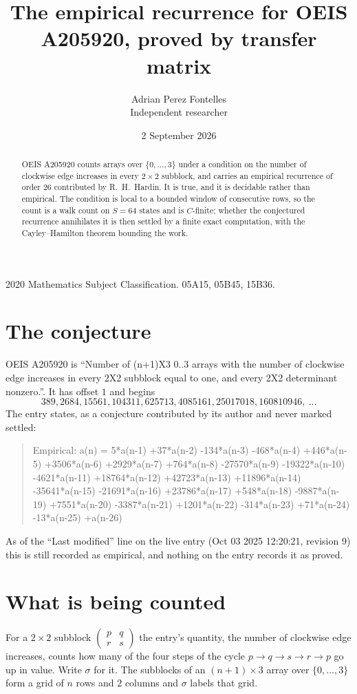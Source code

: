 \documentclass[11pt,a4paper]{article}
\title{The empirical recurrence for OEIS A205920, proved by transfer matrix}
\author{Adrian Perez Fontelles\\ \small Independent researcher}
\date{2 September 2026}
\theoremstyle{plain}
\theoremstyle{definition}
\begin{document}
\maketitle

\begin{abstract}
OEIS A205920 counts arrays over $\{0,\dots,3\}$ under a condition on the number of clockwise edge increases
in every $2\times2$ subblock, and carries an empirical recurrence of order $26$ contributed by
R.~H.~Hardin. It is true, and it is decidable rather than empirical. The condition is local to
a bounded window of consecutive rows, so the count is a walk count on $S=64$ states and is
$C$-finite; whether the conjectured recurrence annihilates it is then settled by a finite exact
computation, with the Cayley--Hamilton theorem bounding the work.
\end{abstract}

\noindent\small 2020 Mathematics Subject Classification. 05A15, 05B45, 15B36.\normalsize

\section{The conjecture}

OEIS A205920 is ``Number of (n+1)X3 0..3 arrays with the number of clockwise edge increases in every 2X2 subblock equal to one, and every 2X2 determinant nonzero.''. It has offset $1$ and begins
\[
389, 2684, 15561, 104311, 625713, 4085161, 25017018, 160810946,\ \dots
\]
The entry states, as a conjecture contributed by its author and never marked settled:
\begin{quote}
Empirical: a(n) = 5*a(n-1) +37*a(n-2) -134*a(n-3) -468*a(n-4) +446*a(n-5) +3506*a(n-6) +2929*a(n-7) +764*a(n-8) -27570*a(n-9) -19322*a(n-10) -4621*a(n-11) +18764*a(n-12) +42723*a(n-13) +11896*a(n-14) -35641*a(n-15) -21691*a(n-16) +23786*a(n-17) +548*a(n-18) -9887*a(n-19) +7551*a(n-20) -3387*a(n-21) +1201*a(n-22) -314*a(n-23) +71*a(n-24) -13*a(n-25) +a(n-26)
\end{quote}
As of the ``Last modified'' line on the live entry (Oct 03 2025 12:20:21, revision 9) this is still
recorded as empirical, and nothing on the entry records it as proved.

\section{What is being counted}

For a $2\times2$ subblock $\begin{pmatrix}p&q\\r&s\end{pmatrix}$ the
entry's quantity, the number of clockwise edge increases, counts how many of the four steps of the cycle $p\to q\to s\to r\to p$ go up in value. Write $\sigma$ for it. The subblocks of an
$(n+1)\times3$ array over $\{0,\dots,3\}$ form a grid of $n$ rows and $2$
columns and $\sigma$ labels that grid.
\end{document}
